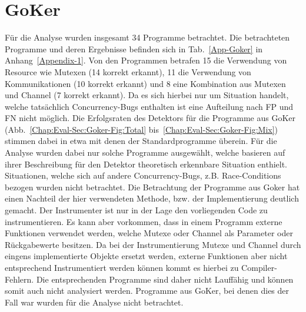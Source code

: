 \section{GoKer}
Für die Analyse wurden insgesamt 34 Programme betrachtet. Die betrachteten 
Programme und deren Ergebnisse befinden sich in Tab.~\ref{App-Goker} 
in Anhang~\ref{Appendix-1}. Von den Programmen betrafen 15 die 
Verwendung von Resource wie Mutexen (14 korrekt erkannt), 11 die 
Verwendung von Kommunikationen (10 korrekt erkannt) und 8 eine Kombination aus Mutexen und 
Channel (7 korrekt erkannt). Da es sich hierbei nur um Situation handelt, welche 
tatsächlich Concurrency-Bugs enthalten ist eine Aufteilung nach FP und FN nicht 
möglich.
Die Erfolgsraten des Detektors für die Programme aus GoKer 
(Abb.~\ref{Chap:Eval-Sec:Goker-Fig:Total} bis~\ref{Chap:Eval-Sec:Goker-Fig:Mix})
stimmen dabei in etwa mit denen der Standardprogramme überein.
Für die Analyse wurden dabei nur solche Programme ausgewählt,
welche basieren auf ihrer Beschreibung für den Detektor theoretisch erkennbare 
Situation enthielt. Situationen, welche sich auf andere Concurrency-Bugs,
z.B. Race-Conditions bezogen wurden nicht betrachtet. 
Die Betrachtung der Programme aus Goker hat einen Nachteil der hier 
verwendeten Methode, bzw. der Implementierung deutlich gemacht.
Der Instrumenter ist nur in der Lage den vorliegenden Code zu instrumentieren. 
Es kann aber vorkommen, dass in einem Programm externe Funktionen 
verwendet werden, welche Mutexe oder Channel als Parameter oder 
Rückgabewerte besitzen. Da bei der Instrumentierung Mutexe und Channel 
durch eingens implementierte Objekte ersetzt werden, externe Funktionen 
aber nicht entsprechend Instrumentiert werden können kommt es 
hierbei zu Compiler-Fehlern. Die entsprechenden Programme sind daher nicht 
Lauffähig und können somit auch nicht analysiert werden. Programme aus GoKer, 
bei denen dies der Fall war wurden für die Analyse nicht betrachtet. 

